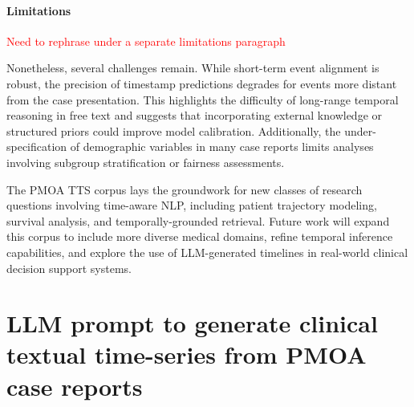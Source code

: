 \documentclass[pmlr]{jmlr}%
\begin{document}
\paragraph{Limitations} \textcolor{red}{Need to rephrase under a separate limitations paragraph}

Nonetheless, several challenges remain. While short-term event alignment is robust, the precision of timestamp predictions degrades for events more distant from the case presentation. This highlights the difficulty of long-range temporal reasoning in free text and suggests that incorporating external knowledge or structured priors could improve model calibration. Additionally, the under-specification of demographic variables in many case reports limits analyses involving subgroup stratification or fairness assessments.

The PMOA TTS corpus lays the groundwork for new classes of research questions involving time-aware NLP, including patient trajectory modeling, survival analysis, and temporally-grounded retrieval. Future work will expand this corpus to include more diverse medical domains, refine temporal inference capabilities, and explore the use of LLM-generated timelines in real-world clinical decision support systems.





\newpage
\appendix
\section{LLM prompt to generate clinical textual time-series from PMOA case reports}
\end{document}
